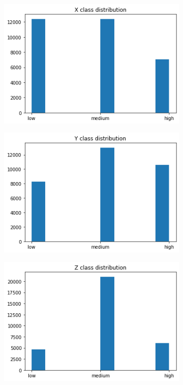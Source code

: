 \begin{figure}[!h]
	\begin{center}
		\begin{subfigure}[h]{0.24\textwidth}
			\centering
			\includegraphics[width=1\textwidth]{"contents/images/distributions/x-class"}
		\end{subfigure}
		\hfill
		\begin{subfigure}[h]{0.24\textwidth}
			\centering
			\includegraphics[width=1\textwidth]{"contents/images/distributions/y-class"}
		\end{subfigure}
		\hfill
		\begin{subfigure}[h]{0.24\textwidth}
			\centering
			\includegraphics[width=1\textwidth]{"contents/images/distributions/z-class"}

\end{subfigure}
\end{center}
\end{figure}
